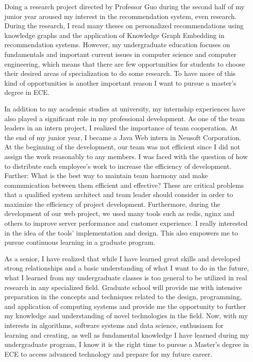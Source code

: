\documentclass[16pt，letterpaper]{ctexart}
\begin{document}
Doing a research project directed by Professor Guo during the second half of my junior year aroused my interest in the recommendation system, even research. During the research, I read many theses on personalized recommendations using knowledge graphs and the application of Knowledge Graph Embedding in recommendation systems. However, my undergraduate education focuses on fundamentals and important current issues in computer science and computer engineering, which means that there are few opportunities for students to choose their desired areas of specialization to do some research. To have more of this kind of opportunities is another important reason I want to pursue a master’s degree in ECE. 

In addition to my academic studies at university, my internship experiences have also played a significant role in my professional development. As one of the team leaders in an intern project, I realized the importance of team cooperation. At the end of my junior year, I became a Java Web intern in Neusoft Corporation. At the beginning of the development, our team was not efficient since I did not assign the work reasonably to any members. I was faced with the question of how to distribute each employee’s work to increase the efficiency of development. Further: What is the best way to maintain team harmony and make communication between them efficient and effective?  These are critical problems that a qualified system architect and team leader should consider in order to maximize the efficiency of project development. Furthermore, during the development of our web project, we used many tools such as redis, nginx and others to improve server performance and customer experience. I really interested in the idea of the tools’ implementation and design. This also empowers me to pursue continuous learning in a graduate program. 

As a senior, I have realized that while I have learned great skills and developed strong relationships and a basic understanding of what I want to do in the future, what I learned from my undergraduate classes is too general to be utilized in real research in any specialized field. Graduate school will provide me with intensive preparation in the concepts and techniques related to the design, programming, and application of computing systems and provide me the opportunity to further my knowledge and understanding of novel technologies in the field. Now, with my interests in algorithms, software systems and data science, enthusiasm for learning and creating, as well as fundamental knowledge I have learned during my undergraduate program, I know it is the right time to pursue a Master’s degree in ECE to access advanced technology and prepare for my future career. 
\end{document}
